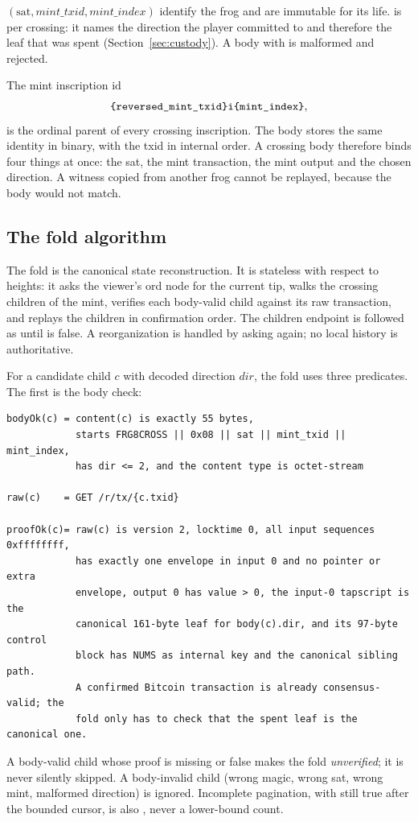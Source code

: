 $(\mathrm{sat},\mathit{mint\_txid},\mathit{mint\_index})$ identify the frog
and are immutable for its life.  is per crossing: it names the
direction the player committed to and therefore the leaf that was spent
(Section~\ref{sec:custody}). A body with  is malformed and
rejected.

The mint inscription id
\[
\text{\code{{reversed_mint_txid}i{mint_index}}},
\]
is the ordinal parent of every crossing inscription. The body stores the
same identity in binary, with the txid in internal order. A crossing body
therefore binds four things at once: the sat, the mint transaction, the mint
output and the chosen direction. A witness copied from another frog cannot
be replayed, because the body would not match.

\subsection{The fold algorithm}

The fold is the canonical state reconstruction. It is stateless with respect
to heights: it asks the viewer's ord node for the current tip, walks the
crossing children of the mint, verifies each body-valid child against its raw
transaction, and replays the children in confirmation order. The children
endpoint is followed as  until
 is false. A reorganization is handled by asking again; no local
history is authoritative.

For a candidate child $c$ with decoded direction $\mathit{dir}$, the fold
uses three predicates. The first is the body check:
\begin{lstlisting}[language={},caption={Body, raw-transaction and proof predicates.},label={lst:fold-predicates}]
bodyOk(c) = content(c) is exactly 55 bytes,
            starts FRG8CROSS || 0x08 || sat || mint_txid || mint_index,
            has dir <= 2, and the content type is octet-stream

raw(c)    = GET /r/tx/{c.txid}

proofOk(c)= raw(c) is version 2, locktime 0, all input sequences 0xffffffff,
            has exactly one envelope in input 0 and no pointer or extra
            envelope, output 0 has value > 0, the input-0 tapscript is the
            canonical 161-byte leaf for body(c).dir, and its 97-byte control
            block has NUMS as internal key and the canonical sibling path.
            A confirmed Bitcoin transaction is already consensus-valid; the
            fold only has to check that the spent leaf is the canonical one.
\end{lstlisting}
A body-valid child whose proof is missing or false makes the fold
\emph{unverified}; it is never silently skipped. A body-invalid child (wrong
magic, wrong sat, wrong mint, malformed direction) is ignored. Incomplete
pagination, with  still true after the bounded cursor, is also
, never a lower-bound count.

